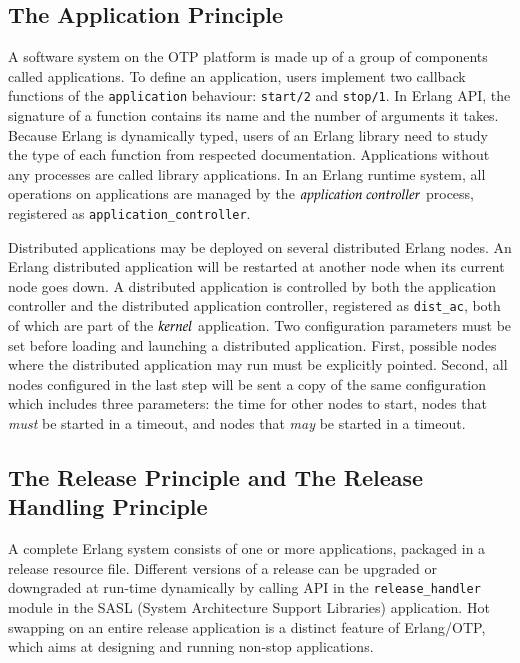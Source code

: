 \newpage
\subsection{The Application Principle}

A software system on the OTP platform is made up of a group of components 
called applications.  To define an application, users implement two callback 
functions of the {\tt application} behaviour: {\tt start/2} and {\tt stop/1}.
In Erlang API, the signature of a function contains its name and the number
of arguments it takes.  Because Erlang is dynamically typed, users of an Erlang
library need to study the type of each function from respected documentation.
Applications without any processes are called library applications.  
In an Erlang runtime system, all operations on applications are managed by the 
$\it{application\ controller}$ process, registered as {\tt application\_controller}.

Distributed applications may be deployed on several distributed Erlang nodes.  
An Erlang distributed application will be restarted at another node when its 
current node goes down.  A distributed application is controlled by both the 
application controller and the distributed application controller, registered as 
{\tt dist\_ac}, both of which are part of the $\it{kernel}$  
application.  Two configuration parameters must be set before loading and 
launching a distributed application.  First, possible nodes where the 
distributed application may run must be explicitly pointed.  Second, all nodes 
configured in the last step will be sent a copy of the same configuration which 
includes three parameters: the time for other nodes to start, nodes that {\it 
must} be started in a timeout, and nodes that {\it may} be started in a 
timeout.


\subsection{The Release Principle and The Release Handling Principle}

A complete Erlang system consists of one or more applications, packaged in a 
release resource file.  Different versions of a release can be upgraded or 
downgraded at run-time dynamically by calling API in the {\tt release\_handler} 
module in the SASL (System Architecture Support Libraries) application.  Hot 
swapping on an entire release application is a distinct feature of Erlang/OTP, 
which aims at designing and running non-stop applications.


